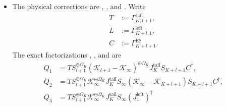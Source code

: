 \documentclass{article}
\begin{document}
\begin{itemize}
          Under nonzero virtual dimension and positive-definite $\rho$,
           proves the limiting
          intertwining identity, and
           identifies
          the centered residual pairing with the length-$l$ Gram error. The
          cancellation uses the nonidentity limiting metric and its inverse; it does
          not require a transfer fixed-point equation.

    \item The physical corrections are
          ,
          , and
          . Write
          \begin{align}
              T
               & :=\Gamma^{\mathrm{tail}}_{K,l+1},
              \label{eq:cpgsv21_martingale_overlap_c3_tail_map} \\
              L
               & :=\Gamma^{\mathrm{left}}_{K+l,1},
              \label{eq:cpgsv21_martingale_overlap_c3_left_map} \\
              C
               & :=\Gamma_{K+l+1}^{\mathrm{ES}}.
              \label{eq:cpgsv21_martingale_overlap_c3_full_map}
          \end{align}
          The exact factorizations
          ,
          , and
           are
          \begin{align}
              Q_1
               & =
              TS_{l+1}^{\oplus\Omega_K}
              (\mathcal K_{l+1}-\mathcal K_\infty)^{\oplus\Omega_K}
              J_K^{\mathrm{tail}}S_{K+l+1}C^\dagger,
              \label{eq:cpgsv21_martingale_overlap_c3_first_correction}  \\
              Q_2
               & =
              TS_{l+1}^{\oplus\Omega_K}
              \mathcal K_\infty^{\oplus\Omega_K}
              J_K^{\mathrm{tail}}S_\infty
              (\mathcal K_\infty-\mathcal K_{K+l+1})
              S_{K+l+1}C^\dagger,
              \label{eq:cpgsv21_martingale_overlap_c3_second_correction} \\
              Q_3
               & =
              TS_{l+1}^{\oplus\Omega_K}
              \mathcal K_\infty^{\oplus\Omega_K}
              J_K^{\mathrm{tail}}S_\infty
              (J_1^{\mathrm{left}})^\dagger

\end{align}
\end{itemize}
\end{document}
